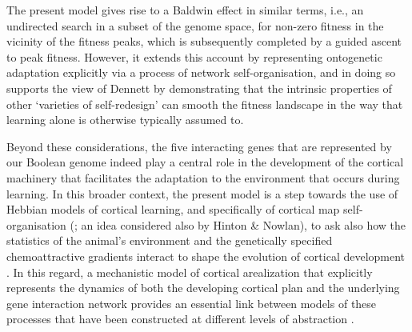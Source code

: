 \documentclass[10pt,letterpaper]{article}
\begin{document}
The present model gives rise to a Baldwin effect in similar terms, i.e., an undirected search in a subset of the genome space, for non-zero fitness in the vicinity of the fitness peaks, which is subsequently completed by a guided ascent to peak fitness. However, it extends this account by representing ontogenetic adaptation explicitly via a process of network self-organisation, and in doing so supports the view of Dennett by demonstrating that the intrinsic properties of other `varieties of self-redesign' can smooth the fitness landscape in the way that learning alone is otherwise typically assumed to.

Beyond these considerations, the five interacting genes that are represented by our Boolean genome indeed play a central role in the development of the cortical machinery that facilitates the adaptation to the environment that occurs during learning. In this broader context, the present model is a step towards the use of Hebbian models of cortical learning, and specifically of cortical map self-organisation (\cite{Wilson2015,Bednar2016}; an idea considered also by Hinton \& Nowlan), to ask also how the statistics of the animal's environment and the genetically specified chemoattractive gradients interact to shape the evolution of cortical development \cite{Krubitzer2013}. In this regard, a mechanistic model of cortical arealization that explicitly represents the dynamics of both the developing cortical plan and the underlying gene interaction network provides an essential link between models of these processes that have been constructed at different levels of abstraction \cite{Karbowski2004}.
\end{document}

